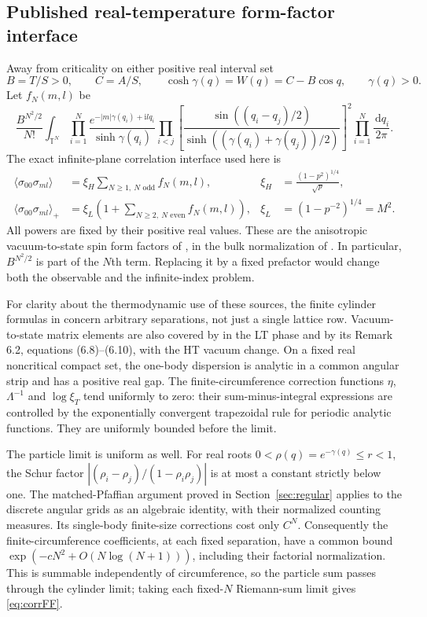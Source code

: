\documentclass[11pt]{article}
\numberwithin{equation}{section}
\theoremstyle{definition}
\newcommand{\T}{\mathbb T}
\newcommand{\dd}{\,\mathrm d}
\newcommand{\ii}{\mathrm i}
\begin{document}
\subsection{Published real-temperature form-factor interface}
Away from criticality on either positive real interval set
\[
 B=T/S>0,\qquad C=A/S,\qquad
 \cosh\gamma(q)=W(q)=C-B\cos q,\qquad \gamma(q)>0.
\]
Let $f_N(m,l)$ be
\begin{equation}\label{eq:corrFF}
 \frac{B^{N^2/2}}{N!}\int_{\T^N}
 \prod_{i=1}^N\frac{e^{-|m|\gamma(q_i)+\ii lq_i}}{\sinh\gamma(q_i)}
 \prod_{i<j}\left[
 \frac{\sin((q_i-q_j)/2)}{\sinh((\gamma(q_i)+\gamma(q_j))/2)}
 \right]^2\prod_{i=1}^N\frac{\dd q_i}{2\pi}.
\end{equation}
The exact infinite-plane correlation interface used here is
\begin{align}
 \langle\sigma_{00}\sigma_{ml}\rangle
   &=\xi_H\sum_{N\ge1,\ N\text{ odd}}f_N(m,l),
   &\xi_H&=\frac{(1-p^2)^{1/4}}{\sqrt p},\label{eq:HTcorr}\\
 \langle\sigma_{00}\sigma_{ml}\rangle_+
   &=\xi_L\left(1+\sum_{N\ge2,\ N\text{ even}}f_N(m,l)\right),
   &\xi_L&=(1-p^{-2})^{1/4}=M^2.\label{eq:LTcorr}
\end{align}
All powers are fixed by their positive real values. These are the
anisotropic vacuum-to-state spin form factors of
\cite{BL,IL}, in the bulk normalization of \cite{ONGP}. In particular,
$B^{N^2/2}$ is part of the $N$th term. Replacing it by a fixed prefactor
would change both the observable and the infinite-index problem.

For clarity about the thermodynamic use of these sources, the finite
cylinder formulas in \cite[(35)--(39)]{BL} concern arbitrary separations,
not just a single lattice row. Vacuum-to-state matrix elements are also
covered by \cite[Theorem 6.1]{IL} in the LT phase and by its
Remark 6.2, equations (6.8)--(6.10), with the HT vacuum change.
On a fixed real noncritical compact set, the one-body dispersion is
analytic in a common angular strip and has a positive real gap. The
finite-circumference correction functions $\eta$, $\Lambda^{-1}$ and
$\log\xi_T$ tend uniformly to zero: their sum-minus-integral expressions
are controlled by the exponentially convergent trapezoidal rule for
periodic analytic functions. They are uniformly bounded before the limit.

The particle limit is uniform as well. For real roots
$0<\rho(q)=e^{-\gamma(q)}\le r<1$, the Schur factor
$|(\rho_i-\rho_j)/(1-\rho_i\rho_j)|$ is at most a constant strictly below
one. The matched-Pfaffian argument proved in
Section~\ref{sec:regular} applies to the discrete angular grids as an
algebraic identity, with their normalized counting measures. Its
single-body finite-size corrections cost only $C^N$. Consequently the
finite-circumference coefficients, at each fixed separation, have a
common bound $\exp(-cN^2+O(N\log(N+1)))$, including their factorial
normalization. This is summable independently of circumference, so the
particle sum passes through the cylinder limit; taking each fixed-$N$
Riemann-sum limit gives \eqref{eq:corrFF}.
\end{document}
